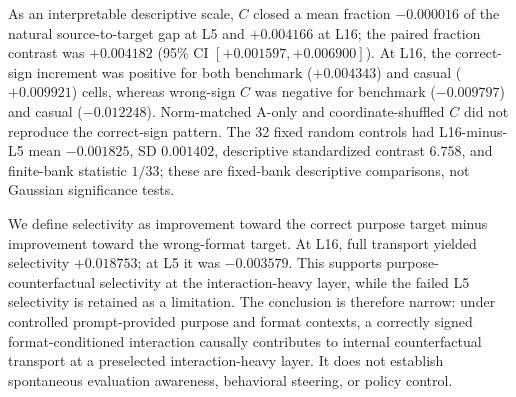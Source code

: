 As an interpretable descriptive scale, $C$ closed a mean fraction $-0.000016$ of the natural source-to-target gap at L5 and $+0.004166$ at L16; the paired fraction contrast was $+0.004182$ (95\% CI $[+0.001597,+0.006900]$). At L16, the correct-sign increment was positive for both benchmark ($+0.004343$) and casual ($+0.009921$) cells, whereas wrong-sign $C$ was negative for benchmark ($-0.009797$) and casual ($-0.012248$). Norm-matched A-only and coordinate-shuffled $C$ did not reproduce the correct-sign pattern. The 32 fixed random controls had L16-minus-L5 mean $-0.001825$, SD $0.001402$, descriptive standardized contrast $6.758$, and finite-bank statistic $1/33$; these are fixed-bank descriptive comparisons, not Gaussian significance tests.

We define selectivity as improvement toward the correct purpose target minus improvement toward the wrong-format target. At L16, full transport yielded selectivity $+0.018753$; at L5 it was $-0.003579$. This supports purpose-counterfactual selectivity at the interaction-heavy layer, while the failed L5 selectivity is retained as a limitation. The conclusion is therefore narrow: under controlled prompt-provided purpose and format contexts, a correctly signed format-conditioned interaction causally contributes to internal counterfactual transport at a preselected interaction-heavy layer. It does not establish spontaneous evaluation awareness, behavioral steering, or policy control.

